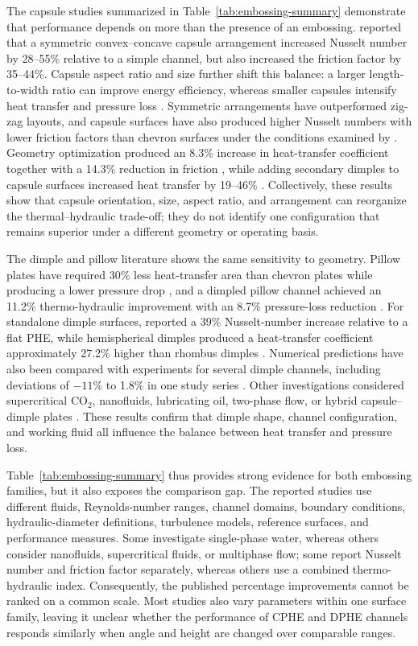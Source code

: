 \documentclass[energies,article,submit,moreauthors,noheaderline]{Definitions/mdpi}
\begin{document}
The capsule studies summarized in Table~\ref{tab:embossing-summary} demonstrate that performance depends on more than the presence of an embossing. \citet{hamedi2024} reported that a symmetric convex--concave capsule arrangement increased Nusselt number by 28--55\% relative to a simple channel, but also increased the friction factor by 35--44\%. Capsule aspect ratio and size further shift this balance: a larger length-to-width ratio can improve energy efficiency, whereas smaller capsules intensify heat transfer and pressure loss \citep{jiang2019a, jiang2020}. Symmetric arrangements have outperformed zig-zag layouts, and capsule surfaces have also produced higher Nusselt numbers with lower friction factors than chevron surfaces under the conditions examined by \citet{zhang2016}. Geometry optimization produced an 8.3\% increase in heat-transfer coefficient together with a 14.3\% reduction in friction \citep{yu2024}, while adding secondary dimples to capsule surfaces increased heat transfer by 19--46\% \citep{shao2024}. Collectively, these results show that capsule orientation, size, aspect ratio, and arrangement can reorganize the thermal--hydraulic trade-off; they do not identify one configuration that remains superior under a different geometry or operating basis.

The dimple and pillow literature shows the same sensitivity to geometry. Pillow plates have required 30\% less heat-transfer area than chevron plates while producing a lower pressure drop \citep{arsenyeva2019}, and a dimpled pillow channel achieved an 11.2\% thermo-hydraulic improvement with an 8.7\% pressure-loss reduction \citep{piper2019}. For standalone dimple surfaces, \citet{soman2022} reported a 39\% Nusselt-number increase relative to a flat PHE, while hemispherical dimples produced a heat-transfer coefficient approximately 27.2\% higher than rhombus dimples \citep{ying2021}. Numerical predictions have also been compared with experiments for several dimple channels, including deviations of $-11\%$ to 1.8\% in one study series \citep{mocnik2020, mocnik2023, mocnik2024}. Other investigations considered supercritical CO$_2$, nanofluids, lubricating oil, two-phase flow, or hybrid capsule--dimple plates \citep{jing2019, li2019, soman2019, torre2019, shao2024}. These results confirm that dimple shape, channel configuration, and working fluid all influence the balance between heat transfer and pressure loss.

Table~\ref{tab:embossing-summary} thus provides strong evidence for both embossing families, but it also exposes the comparison gap. The reported studies use different fluids, Reynolds-number ranges, channel domains, boundary conditions, hydraulic-diameter definitions, turbulence models, reference surfaces, and performance measures. Some investigate single-phase water, whereas others consider nanofluids, supercritical fluids, or multiphase flow; some report Nusselt number and friction factor separately, whereas others use a combined thermo-hydraulic index. Consequently, the published percentage improvements cannot be ranked on a common scale. Most studies also vary parameters within one surface family, leaving it unclear whether the performance of CPHE and DPHE channels responds similarly when angle and height are changed over comparable ranges.
\end{document}
